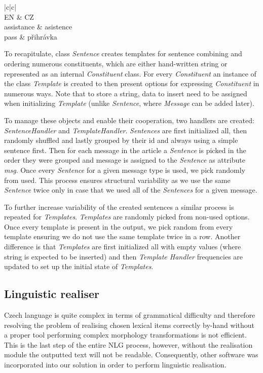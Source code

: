 \begin{center}
	\begin{tabular}{ |c|c| }
		\hline
		 \\ \hline
		 EN & CZ \\ \hline
		assistance  & asistence\\
		pass & přihrávka \\
		\hline
	\end{tabular}
\end{center}

To recapitulate, class \textit{Sentence} creates templates for sentence combining and ordering numerous constituents, which are either hand-written string or represented as an internal \textit{Constituent} class. For every \textit{Constituent} an instance of the class \textit{Template} is created to then present options for expressing \textit{Constituent} in numerous ways. Note that to store a string, data to insert need to be assigned when initializing \textit{Template} (unlike \textit{Sentence}, where \textit{Message} can be added later).

To manage these objects and enable their cooperation, two handlers are created: \textit{SentenceHandler} and \textit{TemplateHandler}. \textit{Sentences} are first initialized all, then randomly shuffled and lastly grouped by their id and always using a simple sentence first. Then for each message in the article a \textit{Sentence} is picked in the order they were grouped and message is assigned to the \textit{Sentence} as attribute \textit{msg}. Once every \textit{Sentence} for a given message type is used, we pick randomly from used. This process ensures structural variability as we use the same \textit{Sentence} twice only in case that we used all of the \textit{Sentences} for a given message.

To further increase variability of the created sentences a similar process is repeated for \textit{Templates}. \textit{Templates} are randomly picked from non-used options. Once every template is present in the output, we pick random from every template ensuring we do not use the same template twice in a row. Another difference is that \textit{Templates} are first initialized all with empty values (where string is expected to be inserted) and then \textit{Template Handler} frequencies are updated to set up the initial state of \textit{Templates}. 

\subsection{Linguistic realiser}
Czech language is quite complex in terms of grammatical difficulty and therefore resolving the problem of realising chosen lexical items correctly by-hand without a proper tool performing complex morphology transformations is not efficient. This is the last step of the entire NLG process, however, without the realisation module the outputted text will not be readable. Consequently, other software was incorporated into our solution in order to perform linguistic realisation.

